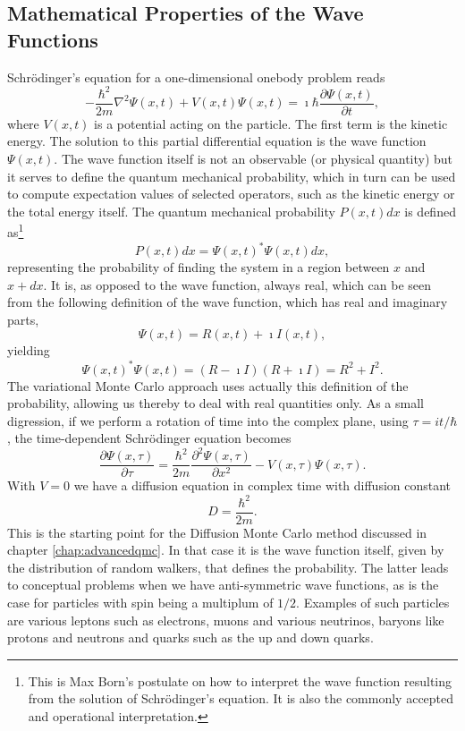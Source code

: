 \subsection{Mathematical Properties of the Wave Functions}
Schr\"odinger's equation for a one-dimensional onebody problem reads
\[
    -\frac{\hbar^2}{2m}\nabla^2\Psi(x,t)+
V(x,t)\Psi(x,t)=
    \imath\hbar\frac{\partial \Psi(x,t)}{\partial t},
\]
where $V(x,t)$ is a potential acting on the particle. The first term is the kinetic energy.
The solution to this partial differential equation is the wave function $\Psi(x,t)$.
The wave function itself is not an observable (or physical quantity) but it serves to define 
the quantum mechanical probability, which in turn can be used to compute expectation values of 
selected operators, such as the kinetic energy or the total energy  itself.
The quantum mechanical probability $P(x,t)dx$ is defined as\footnote{This is Max Born's postulate on how to
interpret the wave function resulting from the solution of Schr\"odinger's equation. It is also
the commonly accepted and operational interpretation.}
\[
   P(x,t)dx=\Psi(x,t)^*\Psi(x,t)dx,
\]
representing the probability 
of finding the system in a region between
$x$ and $x+dx$. It is, as opposed to the wave function, 
always real, which can be seen from the following definition of the wave function, which has real
and imaginary parts,
\[
   \Psi(x,t)=R(x,t)+\imath I(x,t),
\]
yielding
\[
   \Psi(x,t)^*\Psi(x,t)=(R-\imath I)(R+\imath I)=R^2+I^2.
\]
The variational Monte Carlo approach uses actually this definition of the probability, allowing us thereby 
to deal with real quantities only.
As a small digression, if we perform a rotation of time into the complex plane, using 
$\tau = it/\hbar$, 
the time-dependent Schr\"odinger equation becomes
\[
  \frac{\partial \Psi(x,\tau)}{\partial \tau} = 
  \frac{\hbar^2}{2m} \frac{\partial^2\Psi(x,\tau)}{\partial x^2}
   -V(x,\tau)\Psi(x,\tau).
\]
With $V=0$ we have a diffusion equation in complex time with 
diffusion constant  
\[
   D= \frac{\hbar^2}{2m}.
\]
This is the starting point for the Diffusion Monte Carlo method discussed in chapter \ref{chap:advancedqmc}.
In that case it is the wave function itself, given by the distribution of random walkers, that defines the probability.
The latter leads to conceptual problems when we have anti-symmetric wave functions, as is the case for particles
with spin being a multiplum of $1/2$. Examples of such particles are various leptons such as electrons, muons and various neutrinos, 
baryons like protons and neutrons and quarks such as the up and down quarks. 

